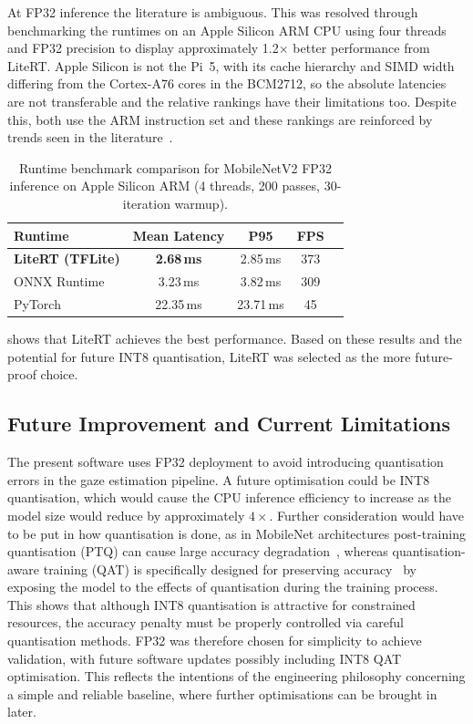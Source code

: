 At FP32 inference the literature is ambiguous. This was resolved through benchmarking the runtimes on an Apple Silicon ARM CPU using four threads and FP32 precision to display approximately 1.2$\times$ better performance from LiteRT. Apple Silicon is not the Pi~5, with its cache hierarchy and SIMD width differing from the Cortex-A76 cores in the BCM2712, so the absolute latencies are not transferable and the relative rankings have their limitations too. Despite this, both use the ARM instruction set and these rankings are reinforced by trends seen in the literature~\cite{baller2021deepedgebench}.

\begin{table}[htbp]
    \centering
    \caption{Runtime benchmark comparison for MobileNetV2 FP32 inference on Apple Silicon ARM (4 threads, 200 passes, 30-iteration warmup).}
    \label{tab:runtime-benchmark}
    \begin{tabular}{lcccc}
        \toprule
        \textbf{Runtime} & \textbf{Mean Latency} & \textbf{P95} & \textbf{FPS}\\
        \midrule
        \textbf{LiteRT (TFLite)} & \textbf{2.68\,ms} & 2.85\,ms & 373\\
        ONNX Runtime             & 3.23\,ms           & 3.82\,ms & 309 \\
        PyTorch                  & 22.35\,ms          & 23.71\,ms & 45 \\
        \bottomrule
    \end{tabular}
\end{table}

 shows that LiteRT achieves the best performance. Based on these results and the potential for future INT8 quantisation, LiteRT was selected as the more future-proof choice.

\subsection{Future Improvement and Current Limitations}

The present software uses FP32 deployment to avoid introducing quantisation errors in the gaze estimation pipeline. A future optimisation could be INT8 quantisation, which would cause the CPU inference efficiency to increase as the model size would reduce by approximately $4\times$. Further consideration would have to be put in how quantisation is done, as in MobileNet architectures post-training quantisation (PTQ) can cause large accuracy degradation~\cite{yun2021mobilenets}, whereas quantisation-aware training (QAT) is specifically designed for preserving accuracy~\cite{google_qat} by exposing the model to the effects of quantisation during the training process. This shows that although INT8 quantisation is attractive for constrained resources, the accuracy penalty must be properly controlled via careful quantisation methods. FP32 was therefore chosen for simplicity to achieve validation, with future software updates possibly including INT8 QAT optimisation. This reflects the intentions of the engineering philosophy concerning a simple and reliable baseline, where further optimisations can be brought in later.

